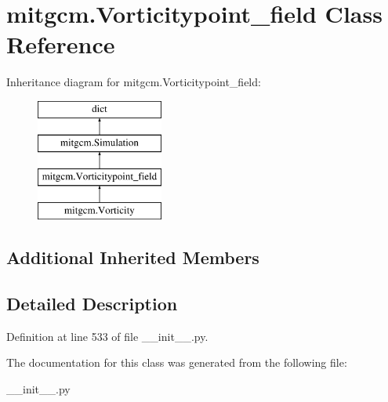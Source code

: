 \hypertarget{classmitgcm_1_1Vorticitypoint__field}{\section{mitgcm.\+Vorticitypoint\+\_\+field Class Reference}
\label{classmitgcm_1_1Vorticitypoint__field}
}
Inheritance diagram for mitgcm.\+Vorticitypoint\+\_\+field\+:\begin{figure}[H]
\begin{center}
\leavevmode
\includegraphics[height=4.000000cm]{classmitgcm_1_1Vorticitypoint__field}
\end{center}
\end{figure}
\subsection*{Additional Inherited Members}


\subsection{Detailed Description}


Definition at line 533 of file \+\_\+\+\_\+init\+\_\+\+\_\+.\+py.



The documentation for this class was generated from the following file\+:\begin{DoxyCompactItemize}
\item 
\+\_\+\+\_\+init\+\_\+\+\_\+.\+py\end{DoxyCompactItemize}
